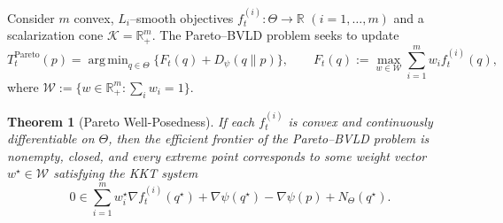 \documentclass[11pt]{article}
\DeclareMathOperator*{\argmin}{arg\,min}
\theoremstyle{plain}
\newtheorem{theorem}{Theorem}[section]
\theoremstyle{definition}
\theoremstyle{remark}
\begin{document}
Consider $m$ convex, $L_i$–smooth objectives 
$f_t^{(i)}:\Theta\to\mathbb R$ $(i=1,\ldots,m)$ and a scalarization cone 
$\mathcal K=\mathbb R_+^m$.  
The Pareto–BVLD problem seeks to update
\[
T_t^{\mathrm{Pareto}}(p)
=\argmin_{q\in\Theta}
\big\{
F_t(q)+D_\psi(q\|p)
\big\},
\qquad 
F_t(q):=\max_{w\in\mathcal W}\sum_{i=1}^m w_i f_t^{(i)}(q),
\]
where $\mathcal W:=\{w\in\mathbb R_+^m:\sum_i w_i=1\}$.

\begin{theorem}[Pareto Well-Posedness]
\label{thm:pareto}
If each $f_t^{(i)}$ is convex and continuously differentiable on $\Theta$, 
then the efficient frontier of the Pareto–BVLD problem is nonempty, closed, 
and every extreme point corresponds to some weight vector 
$w^\star\in\mathcal W$ satisfying the KKT system
\[
0\in\sum_{i=1}^m w_i^\star\nabla f_t^{(i)}(q^\star)
+\nabla\psi(q^\star)-\nabla\psi(p)+N_\Theta(q^\star).
\]
\end{theorem}
\end{document}
